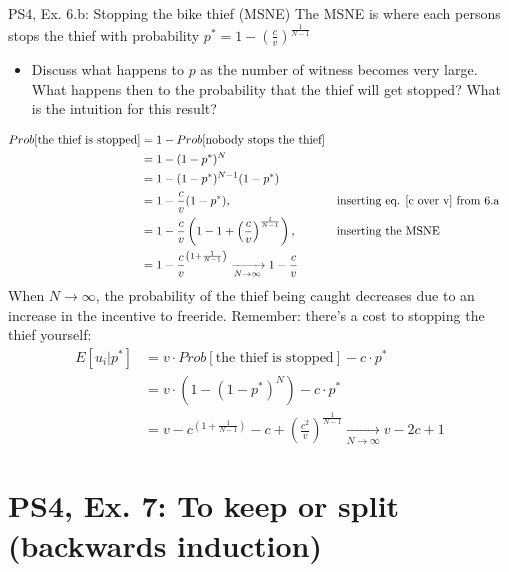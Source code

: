 \begin{frame}{PS4, Ex. 6.b: Stopping the bike thief (MSNE)}
    The MSNE is where each persons stops the thief with probability $p^{*}=1-\left(\frac{c}{v}\right)^{\frac{1}{N-1}}$
    \begin{itemize}
      \item[b)] Discuss what happens to $p$ as the number of witness becomes very large. What happens then to the probability that the thief will get stopped? What is the intuition for this result?
    \end{itemize}
    \vspace{-10pt}
    \begin{align*}
        Prob[\text{the thief is stopped}]&=1-Prob[\text{nobody stops the thief}]\\
            &=1-(1-p^{*})^{N}\\
            &=1-(1-p^{*})^{N-1}(1-p^{*})\\
            &=1-\frac{c}{v}(1-p^{*}),&&\text{inserting eq. \eqref{c over v} from 6.a}\\
            &=1-\frac{c}{v}\left(1-1+\left(\frac{c}{v}\right)^{\frac{1}{N-1}}\right),&&\text{inserting the MSNE}\\
            &=1-\frac{c}{v}^{\left(1+\frac{1}{N-1}\right)}\xrightarrow[N\to\infty]{}1-\frac{c}{v}
    \end{align*}
    When $N\rightarrow\infty$, the probability of the thief being caught decreases due to an increase in the incentive to freeride. Remember: there's a cost to stopping the thief yourself:
    \begin{align*}
        E[u_i|p^{*}]&=v\cdot Prob[\text{the thief is stopped}]-c\cdot p^{*}\\
            &=v\cdot \left(1-(1-p^{*})^{N}\right)-c\cdot p^{*}\\
            &= v-c^{\left(1+\frac{1}{N-1}\right)}-c+\left(\frac{c^2}{v}\right)^{\frac{1}{N-1}}
            \xrightarrow[N\to\infty]{} v-2c+1
    \end{align*}
  \vfill\null
\end{frame}


\section{PS4, Ex. 7: To keep or split (backwards induction)}

